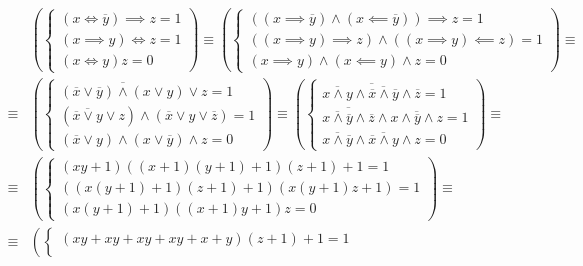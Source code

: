 \documentclass[12pt,a4paper]{article}
\theoremstyle{plain}
\theoremstyle{definition}
\theoremstyle{remark}
\numberwithin{equation}{section}
\begin{document}
\subsection{}
  \begin{equation*}
  \begin{aligned}
  &\left(\begin{cases}
  (x \iff \overline y) \implies z = 1 \\
  (x \implies y) \iff z = 1 \\
  (x \iff y)z = 0
  \end{cases}\right)
  \equiv
  \left(\begin{cases}
  ((x \implies \overline y) \land (x \impliedby \overline y)) \implies z = 1 \\
  ((x \implies y) \implies z) \land ((x \implies y) \impliedby z) = 1 \\
  (x \implies y) \land (x \impliedby y) \land z = 0
  \end{cases}\right)
  \equiv \\ \equiv
  &\left(\begin{cases}
  \overline{(\overline x \lor \overline y) \land (x \lor y)} \lor z = 1 \\
  (\overline{\overline x \lor y} \lor z) \land (\overline x \lor y \lor \overline z) = 1 \\
  (\overline x \lor y) \land (x \lor \overline y) \land z = 0
  \end{cases}\right)
  \equiv
  \left(\begin{cases}
  \overline{\overline{x \land y} \land \overline{\overline x \land \overline y} \land \overline z} = 1 \\
  \overline{\overline{ x \land \overline y} \land \overline z} \land \overline{ x \land \overline y \land z} = 1 \\
  \overline{x \land \overline y} \land \overline{\overline x \land y} \land z = 0
  \end{cases}\right)
  \equiv \\ \equiv
  &\left(\begin{cases}
  (xy + 1)((x + 1)(y + 1) + 1)(z + 1) + 1 = 1 \\
  ((x(y + 1) + 1)(z + 1) + 1)(x(y + 1)z + 1) = 1 \\
  (x(y + 1) + 1)((x + 1) y + 1)z = 0
  \end{cases}\right)
  \equiv \\ \equiv
  &\left(\begin{cases}
  (xy + xy + xy + xy + x + y)(z + 1) + 1 = 1 \\

\end{cases}
\end{aligned}
\end{equation*}
\end{document}
